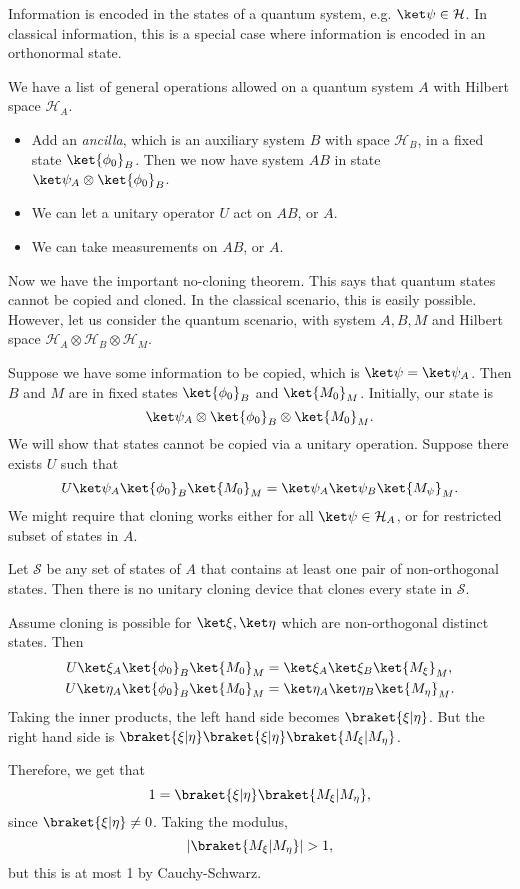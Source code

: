 \documentclass[12pt]{article}
\begin{document}
Information is encoded in the states of a quantum system, e.g. $\ket \psi \in \mathcal{H}$. In classical information, this is a special case where information is encoded in an orthonormal state.

We have a list of general operations allowed on a quantum system $A$ with Hilbert space $\mathcal{H}_A$.
\begin{itemize}
	\item Add an \emph{ancilla}, which is an auxiliary system $B$ with space $\mathcal{H}_B$, in a fixed state $\ket{\phi_0}_B$. Then we now have system $AB$ in state $\ket \psi_A \otimes \ket{\phi_0}_B$.
	\item We can let a unitary operator $U$ act on $AB$, or $A$.
	\item We can take measurements on $AB$, or $A$.
\end{itemize}

Now we have the important no-cloning theorem. This says that quantum states cannot be copied and cloned. In the classical scenario, this is easily possible. However, let us consider the quantum scenario, with system $A, B, M$ and Hilbert space $\mathcal{H}_A \otimes \mathcal{H}_B \otimes \mathcal{H}_M$.

Suppose we have some information to be copied, which is $\ket \psi = \ket \psi_A$. Then $B$ and $M$ are in fixed states $\ket{\phi_0}_B$ and $\ket{M_0}_M$. Initially, our state is
\[
	\ket \psi_A \otimes \ket{\phi_0}_B \otimes \ket{M_0}_M.
\]
We will show that states cannot be copied via a unitary operation. Suppose there exists $U$ such that
\[
	U \ket \psi_A \ket{\phi_0}_B \ket{M_0}_M = \ket \psi_A \ket \psi_B \ket{M_\psi}_M.
\]
We might require that cloning works either for all $\ket \psi \in \mathcal{H}_A$, or for restricted subset of states in $A$.

\begin{theorem}
	Let $\mathcal{S}$ be any set of states of $A$ that contains at least one pair of non-orthogonal states. Then there is no unitary cloning device that clones every state in $\mathcal{S}$.
\end{theorem}

\begin{proofbox}
	Assume cloning is possible for $\ket \xi, \ket \eta$ which are non-orthogonal distinct states. Then
	\begin{align*}
		U \ket \xi_A \ket{\phi_0}_B \ket{M_0}_M &= \ket \xi_A \ket \xi_B \ket{M_\xi}_M, \\
		U \ket \eta_A \ket{\phi_0}_B \ket{M_0}_M &= \ket \eta_A \ket \eta_B \ket{M_\eta}_M.
	\end{align*}
	Taking the inner products, the left hand side becomes $\braket{\xi | \eta}$. But the right hand side is $\braket{\xi|\eta}\braket{\xi|\eta} \braket{M_\xi|M_\eta}$.

	Therefore, we get that
	\[
		1 = \braket{\xi|\eta} \braket{M_\xi|M_\eta},
	\]
	since $\braket{\xi|\eta} \neq 0$. Taking the modulus,
	\[
		|\braket{M_\xi|M_\eta}| > 1,
	\]
	but this is at most 1 by Cauchy-Schwarz.
\end{proofbox}
\end{document}
